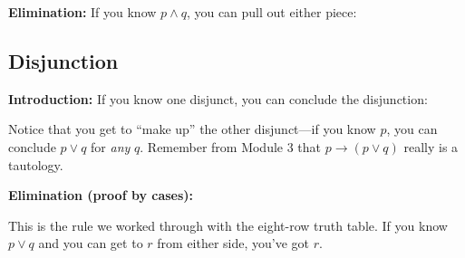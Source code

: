 \documentclass[11pt]{article}
\begin{document}
\noindent\textbf{Elimination:}
If you know $p \wedge q$, you can pull out either piece:
\begin{center}
\begin{minipage}{0.35\textwidth}
\centering
\begin{prooftree}
\end{prooftree}
\end{minipage}
\begin{minipage}{0.35\textwidth}
\centering
\begin{prooftree}
\end{prooftree}
\end{minipage}
\end{center}

\subsection{Disjunction}

\noindent\textbf{Introduction:}
If you know one disjunct, you can conclude the disjunction:
\begin{center}
\begin{minipage}{0.35\textwidth}
\centering
\begin{prooftree}
\end{prooftree}
\end{minipage}
\begin{minipage}{0.35\textwidth}
\centering
\begin{prooftree}
\end{prooftree}
\end{minipage}
\end{center}
Notice that you get to ``make up'' the other disjunct---if you know $p$, you can conclude $p \vee q$ for \emph{any} $q$. Remember from Module 3 that $p \to (p \vee q)$ really is a tautology.

\noindent\textbf{Elimination (proof by cases):}
\begin{center}
\begin{prooftree}
\end{prooftree}
\end{center}
This is the rule we worked through with the eight-row truth table. If you know $p \vee q$ and you can get to $r$ from either side, you've got $r$.
\end{document}
